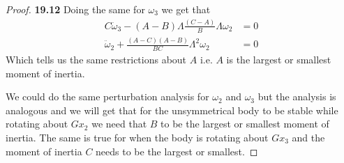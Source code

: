 \documentclass[11pt]{article}
\theoremstyle{definition}
\begin{document}
\begin{proof}{\textbf{19.12}}
    Doing the same for $\omega_3$ we get that
    \begin{align*}
        C\ddot\omega_3 - (A - B)\Lambda\frac{(C - A)}{B}\Lambda\omega_2 &= 0\\
        \ddot\omega_2 + \frac{(A - C)(A - B)}{BC}\Lambda^2\omega_2 &= 0
    \end{align*}
    Which tells us the same restrictions about $A$ i.e. $A$ is the largest or
    smallest moment of inertia.

    We could do the same perturbation analysis for $\omega_2$ and $\omega_3$
    but the analysis is analogous and we will get that for the unsymmetrical
    body to be stable while rotating about $Gx_2$ we need that $B$ to be the
    largest or smallest moment of inertia.
    The same is true for when the body is rotating about $Gx_3$ and the moment
    of inertia $C$ needs to be the largest or smallest.
\end{proof}
\cleardoublepage
\end{document}
